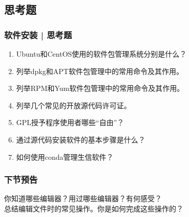 \subsection{思考题}
\begin{frame}
  \frametitle{软件安装 | 思考题}
  \begin{enumerate}
    \item Ubuntu和CentOS使用的软件包管理系统分别是什么？
    \item 列举dpkg和APT软件包管理中的常用命令及其作用。
    \item 列举RPM和Yum软件包管理中的常用命令及其作用。
    \item 列举几个常见的开放源代码许可证。
    \item GPL授予程序使用者哪些“自由”？
    \item 通过源代码安装软件的基本步骤是什么？
    \item 如何使用conda管理生信软件？
  \end{enumerate}
\end{frame}

\begin{frame}
  \frametitle{下节预告}
  你知道哪些编辑器？用过哪些编辑器？有何感受？\\
  总结编辑文件时的常见操作。你是如何完成这些操作的？
\end{frame}




